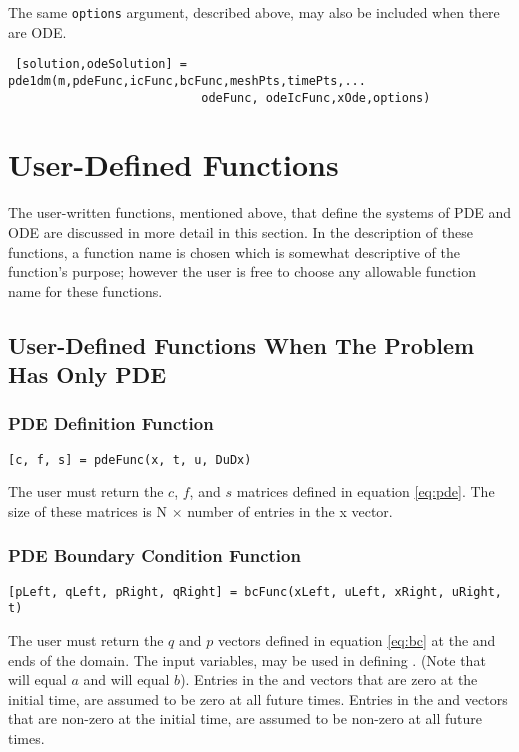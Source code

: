 \documentclass{article}
\begin{document}
The same  {\tt options} argument, described above, may also be included when there are
ODE.
\begin{lstlisting}
 [solution,odeSolution] = pde1dm(m,pdeFunc,icFunc,bcFunc,meshPts,timePts,...
                           odeFunc, odeIcFunc,xOde,options)
\end{lstlisting}

%
\section{User-Defined Functions}
The user-written functions, mentioned above, that define the systems of PDE and ODE are discussed in more detail in this section.
In the description of
these functions, a function name is chosen which is somewhat descriptive of the function's purpose; however the
user is free to choose any allowable function name for these functions.

\subsection{User-Defined Functions When The Problem Has Only PDE}

\subsubsection{PDE Definition Function}
\begin{lstlisting}
[c, f, s] = pdeFunc(x, t, u, DuDx)
\end{lstlisting}
The user must return the $c$, $f$, and $s$ matrices defined in equation \eqref{eq:pde}. The size of these matrices is N $\times$ number of entries in
the x vector. 

\subsubsection{PDE Boundary Condition Function}
\begin{lstlisting}
[pLeft, qLeft, pRight, qRight] = bcFunc(xLeft, uLeft, xRight, uRight, t)
\end{lstlisting}
The user must return the $q$ and $p$ vectors defined in equation \eqref{eq:bc} at the 
and  ends of the domain. The input variables, 
may be used in defining . (Note that  will
equal $a$ and  will equal $b$).
       Entries in the   and     vectors that are zero at the initial time, are assumed to be zero
       at all future times. Entries in the  and     vectors that are non-zero at the initial time,
       are assumed to be non-zero at all future times.
\end{document}
